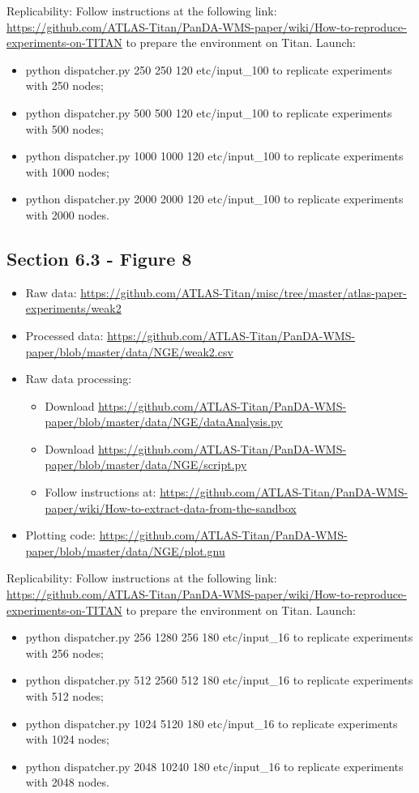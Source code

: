 Replicability: Follow instructions at the following link: \url{https://github.com/ATLAS-Titan/PanDA-WMS-paper/wiki/How-to-reproduce-experiments-on-TITAN} to prepare the environment on Titan.
Launch:
\begin{itemize}
\item python dispatcher.py 250 250 120 etc/input_100 to replicate experiments with 250 nodes;
\item python dispatcher.py 500 500 120 etc/input_100 to replicate experiments with 500 nodes;
\item python dispatcher.py 1000 1000 120 etc/input_100 to replicate experiments with 1000 nodes;
\item python dispatcher.py 2000 2000 120 etc/input_100 to replicate experiments with 2000 nodes.
\end{itemize}



\subsection{Section 6.3 - Figure 8}
\label{apndx:fig10}
\begin{itemize}
    \item Raw data: \url{https://github.com/ATLAS-Titan/misc/tree/master/atlas-paper-experiments/weak2}
     \item Processed data: \url{ https://github.com/ATLAS-Titan/PanDA-WMS-paper/blob/master/data/NGE/weak2.csv} 
    \item Raw data processing: 
    	\begin{itemize}
    		\item Download \url{https://github.com/ATLAS-Titan/PanDA-WMS-paper/blob/master/data/NGE/dataAnalysis.py}
    		\item Download \url{https://github.com/ATLAS-Titan/PanDA-WMS-paper/blob/master/data/NGE/script.py}
    		\item Follow instructions at: \url{https://github.com/ATLAS-Titan/PanDA-WMS-paper/wiki/How-to-extract-data-from-the-sandbox}
   	\end{itemize}
    \item Plotting code: \url{https://github.com/ATLAS-Titan/PanDA-WMS-paper/blob/master/data/NGE/plot.gnu}
\end{itemize}

Replicability: Follow instructions at the following link: \url{https://github.com/ATLAS-Titan/PanDA-WMS-paper/wiki/How-to-reproduce-experiments-on-TITAN} to prepare the environment on Titan.
Launch:
\begin{itemize}
\item python dispatcher.py 256 1280 256 180 etc/input_16 to replicate experiments with 256 nodes;
\item python dispatcher.py 512 2560 512 180 etc/input_16 to replicate experiments with 512 nodes;
\item python dispatcher.py 1024 5120 180 etc/input_16 to replicate experiments with 1024 nodes;
\item python dispatcher.py 2048 10240 180 etc/input_16 to replicate experiments with 2048 nodes.
\end{itemize}


